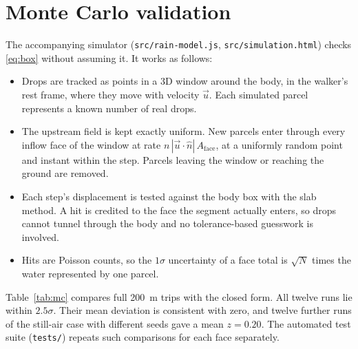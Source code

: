 \documentclass[11pt,a4paper]{article}
\begin{document}
\section{Monte Carlo validation}\label{sec:mc}
The accompanying simulator (\texttt{src/rain-model.js}, \texttt{src/simulation.html}) checks \eqref{eq:box} without assuming it. It works as follows:
\begin{itemize}
\item Drops are tracked as points in a 3D window around the body, in the walker's rest frame, where they move with velocity $\vec u$. Each simulated parcel represents a known number of real drops.
\item The upstream field is kept exactly uniform. New parcels enter through every inflow face of the window at rate $n\,|\vec u\cdot\hat n|\,A_{\text{face}}$, at a uniformly random point and instant within the step. Parcels leaving the window or reaching the ground are removed.
\item Each step's displacement is tested against the body box with the slab method. A hit is credited to the face the segment actually enters, so drops cannot tunnel through the body and no tolerance-based guesswork is involved.
\item Hits are Poisson counts, so the $1\sigma$ uncertainty of a face total is $\sqrt{N}$ times the water represented by one parcel.
\end{itemize}
Table~\ref{tab:mc} compares full \SI{200}{m} trips with the closed form. All twelve runs lie within $2.5\sigma$. Their mean deviation is consistent with zero, and twelve further runs of the still-air case with different seeds gave a mean $z=0.20$. The automated test suite (\texttt{tests/}) repeats such comparisons for each face separately.
\end{document}
